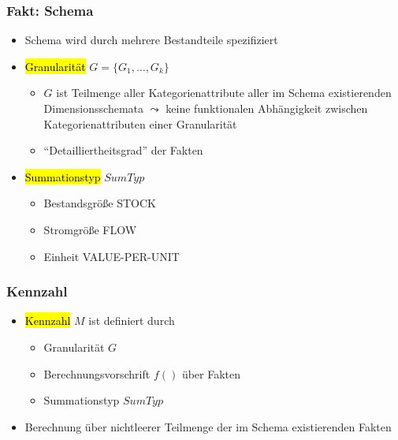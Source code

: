         \begin{frame}

          \frametitle{Fakt: Schema}
          \begin{itemize}
          \item Schema wird durch mehrere  Bestandteile spezifiziert
          \item \hl{Granularität} $G = \{ G_1, \dots , G_k \}$
            \begin{itemize}
            \item $G$ ist Teilmenge aller Kategorienattribute aller im Schema
              existierenden Dimensionsschemata $\leadsto$ keine funktionalen Abhängigkeit zwischen Kategorienattributen
                einer Granularität
            \item "`Detailliertheitsgrad"' der Fakten
            \end{itemize}
          \item \hl{Summationstyp} $SumTyp$
          \begin{itemize}
              \item Bestandsgröße STOCK
              \item Stromgröße FLOW
              \item Einheit VALUE-PER-UNIT
            \end{itemize}
          \end{itemize}


        \end{frame}


        \begin{frame}

        \frametitle{Kennzahl}
        \begin{itemize}
        \item \hl{Kennzahl} $M$ ist definiert durch
        \begin{itemize}
        \item Granularität $G$
        \item Berechnungsvorschrift $f()$ über Fakten
        \item Summationstyp $SumTyp$
        \end{itemize}
        \item Berechnung über nichtleerer Teilmenge der im Schema
          existierenden Fakten
        \end{itemize}

        \end{frame}

